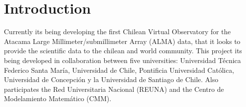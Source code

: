 \section{Introduction}


Currently its being developing the first Chilean Virtual Observatory for the
Atacama Large Millimeter/submillimeter Array (ALMA) data, that it looks to
provide the scientific data to the chilean and world community. This project
its being developed in collaboration between five universities: Universidad
Técnica Federico Santa María, Universidad de Chile, Pontificia Universidad
Católica, Universidad de Concepción y la Universidad de Santiago de Chile.
Also participates the Red Universitaria Nacional (REUNA) and the Centro de
Modelamiento Matemático (CMM).

